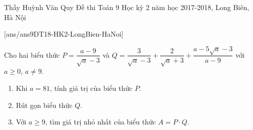 \begin{name}
{Thầy Huỳnh Văn Quy}
{Đề thi Toán 9 Học kỳ 2 năm học 2017-2018, Long Biên, Hà Nội}
\end{name}
\setcounter{ex}{0}
[ans/ans9DT18-HK2-LongBien-HaNoi]
\begin{ex}%
	Cho hai biểu thức $P=\dfrac{a-9}{\sqrt{a}-3}$ và $Q=\dfrac{3}{\sqrt{a}-3}+\dfrac{2}{\sqrt{a}+3}+\dfrac{a-5\sqrt{a}-3}{a-9}$ với $a\geq0$, $a\ne9$.
	\begin{enumerate}[1)]
		\item Khi $a=81$, tính giá trị của biểu thức $P$.
		\item Rút gọn biểu thức $Q$.
		\item Với $a\geq9$, tìm giá trị nhỏ nhất của biểu thức $A=P\cdot Q$.
	\end{enumerate}
\end{ex}

